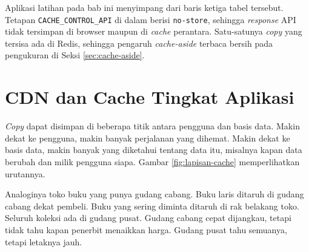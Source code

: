 Aplikasi latihan pada bab ini menyimpang dari baris ketiga tabel tersebut.
Tetapan \texttt{CACHE\_CONTROL\_API} di dalam
 berisi \texttt{no-store}, sehingga
\textit{response} API tidak tersimpan di browser maupun di \textit{cache} perantara.
Satu-satunya \textit{copy} yang tersisa ada di Redis, sehingga pengaruh
\textit{cache-aside} terbaca bersih pada pengukuran di Seksi
\ref{sec:cache-aside}.

\section{CDN dan Cache Tingkat Aplikasi}
\label{sec:cdn-aplikasi}

\textit{Copy} dapat disimpan di beberapa titik antara pengguna dan basis data. Makin
dekat ke pengguna, makin banyak perjalanan yang dihemat. Makin dekat ke basis
data, makin banyak yang diketahui tentang data itu, misalnya kapan data berubah
dan milik pengguna siapa. Gambar \ref{fig:lapisan-cache} memperlihatkan
urutannya.

Analoginya toko buku yang punya gudang cabang. Buku laris ditaruh di gudang
cabang dekat pembeli. Buku yang sering diminta ditaruh di rak belakang toko.
Seluruh koleksi ada di gudang pusat. Gudang cabang cepat dijangkau, tetapi
tidak tahu kapan penerbit menaikkan harga. Gudang pusat tahu semuanya, tetapi
letaknya jauh.

